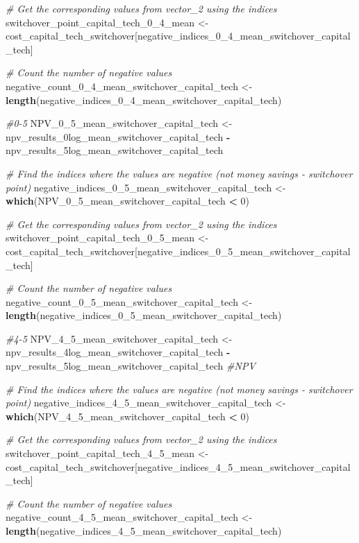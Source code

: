\documentclass[
]{article}
\newenvironment{Shaded}{\begin{snugshade}}{\end{snugshade}}
\newcommand{\CommentTok}[1]{\textcolor[rgb]{0.56,0.35,0.01}{\textit{#1}}}
\newcommand{\DecValTok}[1]{\textcolor[rgb]{0.00,0.00,0.81}{#1}}
\newcommand{\FunctionTok}[1]{\textcolor[rgb]{0.13,0.29,0.53}{\textbf{#1}}}
\newcommand{\NormalTok}[1]{#1}
\newcommand{\OtherTok}[1]{\textcolor[rgb]{0.56,0.35,0.01}{#1}}
\newcommand{\SpecialCharTok}[1]{\textcolor[rgb]{0.81,0.36,0.00}{\textbf{#1}}}
\begin{document}
\begin{Shaded}
\begin{Highlighting}[]
\CommentTok{\# Get the corresponding values from vector\_2 using the indices}
\NormalTok{switchover\_point\_capital\_tech\_0\_4\_mean }\OtherTok{\textless{}{-}}\NormalTok{ cost\_capital\_tech\_switchover[negative\_indices\_0\_4\_mean\_switchover\_capital\_tech]}

\CommentTok{\# Count the number of negative values}
\NormalTok{negative\_count\_0\_4\_mean\_switchover\_capital\_tech }\OtherTok{\textless{}{-}} \FunctionTok{length}\NormalTok{(negative\_indices\_0\_4\_mean\_switchover\_capital\_tech)}



\CommentTok{\#0{-}5}
\NormalTok{NPV\_0\_5\_mean\_switchover\_capital\_tech }\OtherTok{\textless{}{-}}\NormalTok{ npv\_results\_0log\_mean\_switchover\_capital\_tech }\SpecialCharTok{{-}}\NormalTok{ npv\_results\_5log\_mean\_switchover\_capital\_tech}

\CommentTok{\# Find the indices where the values are negative (not money savings {-} switchover point)}
\NormalTok{negative\_indices\_0\_5\_mean\_switchover\_capital\_tech }\OtherTok{\textless{}{-}} \FunctionTok{which}\NormalTok{(NPV\_0\_5\_mean\_switchover\_capital\_tech }\SpecialCharTok{\textless{}} \DecValTok{0}\NormalTok{)}

\CommentTok{\# Get the corresponding values from vector\_2 using the indices}
\NormalTok{switchover\_point\_capital\_tech\_0\_5\_mean }\OtherTok{\textless{}{-}}\NormalTok{ cost\_capital\_tech\_switchover[negative\_indices\_0\_5\_mean\_switchover\_capital\_tech]}

\CommentTok{\# Count the number of negative values}
\NormalTok{negative\_count\_0\_5\_mean\_switchover\_capital\_tech }\OtherTok{\textless{}{-}} \FunctionTok{length}\NormalTok{(negative\_indices\_0\_5\_mean\_switchover\_capital\_tech)}


\CommentTok{\#4{-}5}
\NormalTok{NPV\_4\_5\_mean\_switchover\_capital\_tech }\OtherTok{\textless{}{-}}\NormalTok{ npv\_results\_4log\_mean\_switchover\_capital\_tech }\SpecialCharTok{{-}}\NormalTok{ npv\_results\_5log\_mean\_switchover\_capital\_tech }\CommentTok{\#NPV}

\CommentTok{\# Find the indices where the values are negative (not money savings {-} switchover point)}
\NormalTok{negative\_indices\_4\_5\_mean\_switchover\_capital\_tech }\OtherTok{\textless{}{-}} \FunctionTok{which}\NormalTok{(NPV\_4\_5\_mean\_switchover\_capital\_tech }\SpecialCharTok{\textless{}} \DecValTok{0}\NormalTok{)}

\CommentTok{\# Get the corresponding values from vector\_2 using the indices}
\NormalTok{switchover\_point\_capital\_tech\_4\_5\_mean }\OtherTok{\textless{}{-}}\NormalTok{ cost\_capital\_tech\_switchover[negative\_indices\_4\_5\_mean\_switchover\_capital\_tech]}

\CommentTok{\# Count the number of negative values}
\NormalTok{negative\_count\_4\_5\_mean\_switchover\_capital\_tech }\OtherTok{\textless{}{-}} \FunctionTok{length}\NormalTok{(negative\_indices\_4\_5\_mean\_switchover\_capital\_tech)}
\end{Highlighting}
\end{Shaded}
\end{document}
